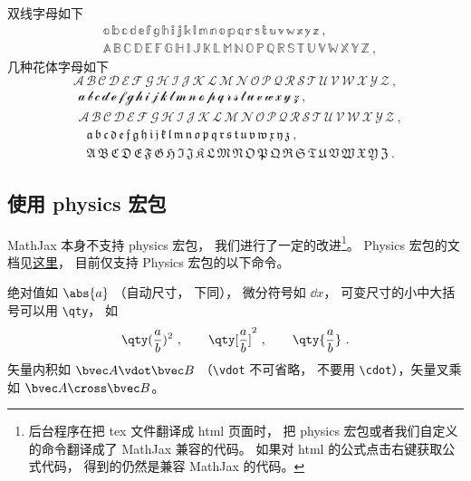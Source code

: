 双线字母如下
\begin{equation}
\begin{aligned}
&\mathbb{a\, b\, c\, d\, e\, f\, g\, h\, i\, j\, k\, l\, m\, n\, o\, p\, q\, r\, s\, t\, u\, v\, w\, x\, y\, z}~,\\
&\mathbb{A\, B\, C\, D\, E\, F\, G\, H\, I\, J\, K\, L\, M\, N\, O\, P\, Q\, R\, S\, T\, U\, V\, W\, X\, Y\, Z}~,
\end{aligned}
\end{equation}
几种花体字母如下
\begin{equation}
\mathcal{A\, B\, C\, D\, E\, F\, G\, H\, I\, J\, K\, L\, M\, N\, O\, P\, Q\, R\, S\, T\, U\, V\, W\, X\, Y\, Z}~,
\end{equation}
\begin{equation}
\begin{aligned}
&\mathscr{a\, b\, c\, d\, e\, f\, g\, h\, i\, j\, k\, l\, m\, n\, o\, p\, q\, r\, s\, t\, u\, v\, w\, x\, y\, z}~,\\
&\mathscr{A\, B\, C\, D\, E\, F\, G\, H\, I\, J\, K\, L\, M\, N\, O\, P\, Q\, R\, S\, T\, U\, V\, W\, X\, Y\, Z}~,
\end{aligned}
\end{equation}
\begin{equation}
\begin{aligned}
&\mathfrak{a\, b\, c\, d\, e\, f\, g\, h\, i\, j\, k\, l\, m\, n\, o\, p\, q\, r\, s\, t\, u\, v\, w\, x\, y\, z}~,\\
&\mathfrak{A\, B\, C\, D\, E\, F\, G\, H\, I\, J\, K\, L\, M\, N\, O\, P\, Q\, R\, S\, T\, U\, V\, W\, X\, Y\, Z}~.
\end{aligned}
\end{equation}

\subsection{使用 physics 宏包}
MathJax 本身不支持 physics 宏包， 我们进行了一定的改进\footnote{后台程序在把 tex 文件翻译成 html 页面时， 把 physics 宏包或者我们自定义的命令翻译成了 MathJax 兼容的代码。 如果对 html 的公式点击右键获取公式代码， 得到的仍然是兼容 MathJax 的代码。}。 Physics 宏包的文档见\href{http://mirrors.ibiblio.org/CTAN/macros/latex/contrib/physics/physics.pdf}{这里}， 目前仅支持 Physics 宏包的以下命令。

绝对值如 $\abs{a}$ （自动尺寸， 下同）， 微分符号如 $\dd{x}$， 可变尺寸的小中大括号可以用 \verb|\qty|， 如
\begin{equation}
\qty(\frac ab)^2~, \qquad \qty[\frac ab]^2~, \qquad \qty{ \frac ab}~.
\end{equation}
矢量内积如 $\bvec A \vdot \bvec B$ （\verb|\vdot| 不可省略， 不要用 \verb|\cdot|），矢量叉乘如 $\bvec A\cross\bvec B$。

